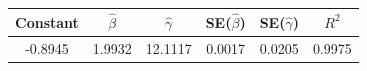 \begin{tabular}{cccccc}
\toprule
Constant & $\hat{\beta}$ & $\hat{\gamma}$ & SE($\hat{\beta}$) & SE($\hat{\gamma}$) & $R^2$ \\
\midrule
-0.8945 & 1.9932 & 12.1117 & 0.0017 & 0.0205 & 0.9975 \\
\bottomrule
\end{tabular}